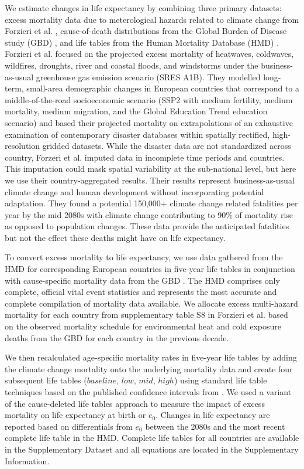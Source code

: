 \documentclass[12pt,]{article}
\begin{document}
We estimate changes in life expectancy by combining three primary
datasets: excess mortality data due to meterological hazards related to
climate change from Forzieri et al. \citep{forzieri2017increasing},
cause-of-death distributions from the Global Burden of Disease study
(GBD) \citep{GBD, wang2012age}, and life tables from the Human Mortality
Database (HMD) \citep{HMD}. Forzieri et al.
\citep{forzieri2017increasing} focused on the projected excess mortality
of heatwaves, coldwaves, wildfires, droughts, river and coastal floods,
and windstorms under the business-as-usual greenhouse gas emission
scenario (SRES A1B). They modelled long-term, small-area demographic
changes in European countries that correspond to a middle-of-the-road
socioeconomic scenario (SSP2 with medium fertility, medium mortality,
medium migration, and the Global Education Trend education scenario) and
based their projected mortality on extrapolations of an exhaustive
examination of contemporary disaster databases within spatially
rectified, high-resolution gridded datasets. While the disaster data are
not standardized across country, Forzeri et al. imputed data in
incomplete time periods and countries. This imputation could mask
spatial variability at the sub-national level, but here we use their
country-aggregated results. Their results represent business-as-usual
climate change and human development without incorporating potential
adaptation. They found a potential 150,000+ climate change related
fatalities per year by the mid 2080s with climate change contributing to
90\% of mortality rise as opposed to population changes. These data
provide the anticipated fatalities but not the effect these deaths might
have on life expectancy.

To convert excess mortality to life expectancy, we use data gathered
from the HMD \citep{HMD} for corresponding European countries in
five-year life tables in conjunction with cause-specific mortality data
from the GBD \citep{GBD, wang2012age}. The HMD comprises only complete,
official vital event statistics and represents the most accurate and
complete compilation of mortality data available. We allocate excess
multi-hazard mortality for each country from supplementary table S8 in
Forzieri et al. \citep{forzieri2017increasing} based on the observed
mortality schedule for environmental heat and cold exposure deaths from
the GBD for each country in the previous decade.

We then recalculated age-specific mortality rates in five-year life
tables by adding the climate change mortality onto the underlying
mortality data and create four subsequent life tables (\(baseline\),
\(low\), \(mid\), \(high\)) using standard life table techniques
\citep{wunsch2013life} based on the published confidence intervals from
\citep{forzieri2017increasing}. We used a variant of the cause-deleted
life tables approach
\citep{brand2005approximations, beltran2008integrated} to measure the
impact of excess mortality on life expectancy at birth or \(e_0\).
Changes in life expectancy are reported based on differentials from
\(e_0\) between the 2080s and the most recent complete life table in the
HMD. Complete life tables for all countries are available in the
Supplementary Dataset and all equations are located in the Supplementary
Information.
\end{document}
